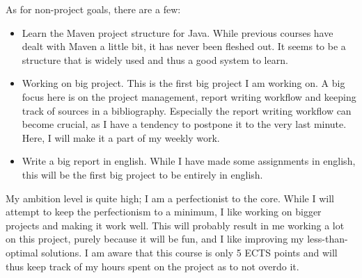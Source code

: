 As for non-project goals, there are a few: 
\begin{itemize}
    \item Learn the Maven project structure for Java. While previous courses
    have dealt with Maven a little bit, it has never been fleshed out. It seems
    to be a structure that is widely used and thus a good system to learn. 

    \item Working on big project. This is the first big project I am working on.
    A big focus here is on the project management, report writing workflow and
    keeping track of sources in a bibliography. Especially the report writing
    workflow can become crucial, as I have a tendency to postpone it to the very
    last minute. Here, I will make it a part of my weekly work. 

    \item Write a big report in english. While I have made some assignments in
    english, this will be the first big project to be entirely in english. 
\end{itemize}

My ambition level is quite high; I am a perfectionist to the core. While I will
attempt to keep the perfectionism to a minimum, I like working on bigger
projects and making it work well. This will probably result in me working a lot
on this project, purely because it will be fun, and I like improving my
less-than-optimal solutions. I am aware that this course is only 5 ECTS points
and will thus keep track of my hours spent on the project as to not overdo it. 

